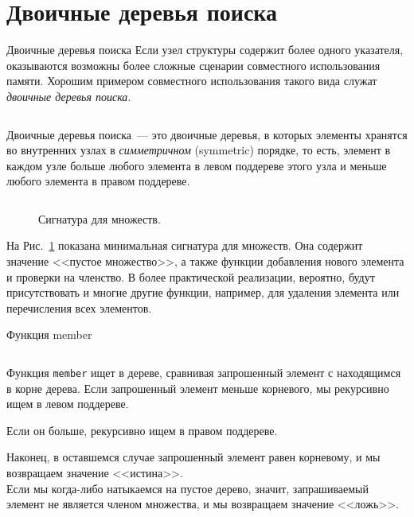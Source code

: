 \documentclass[aspectratio=169
  , xcolor={svgnames}
  , hyperref={ colorlinks,citecolor=DeepPink4
             , linkcolor=DarkRed,urlcolor=DarkBlue}
  , russian
  ]{beamer}
\newcommand{\term}[2]{\textit{#1} (#2)}
\theoremstyle{exerciseStyle1}
\begin{document}
\section{Двоичные деревья поиска}
\label{sc:2.2}

\begin{frame}{Двоичные деревья поиска}
Если узел структуры содержит более одного указателя, оказываются
возможны более сложные сценарии совместного использования памяти. Хорошим примером
совместного использования такого вида служат \emph{двоичные деревья поиска}.

\inputminted[firstline=10, lastline=10] {haskell}{code/SearchTree.hs}

Двоичные деревья поиска~--- это двоичные деревья, в которых элементы
хранятся во внутренних узлах в \term{симметричном}{symmetric}
порядке, то есть, элемент в каждом узле больше любого элемента в
левом поддереве этого узла и меньше любого элемента в правом
поддереве.
\end{frame}

\begin{frame}[fragile]{}
\begin{figure}[h]
  \centering
  \inputminted[firstline=12, lastline=16] {haskell}{code/SearchTree.hs}
  \caption{Сигнатура для множеств.}
\label{fig:2.7}
\end{figure}

На Рис.~\ref{fig:2.7} показана минимальная сигнатура для множеств. Она
содержит значение <<пустое множество>>, а также функции добавления
нового элемента и проверки на членство.  В более практической
реализации, вероятно, будут присутствовать и многие другие функции,
например, для удаления элемента или перечисления всех элементов.
\end{frame}

\begin{frame}[fragile]{Функция member}
  \inputminted[firstline=22, lastline=25] {haskell}{code/SearchTree.hs}

Функция \texttt{member} ищет в дереве, сравнивая запрошенный
элемент с находящимся в корне дерева. Если запрошенный элемент меньше
корневого, мы рекурсивно ищем в левом поддереве.

 Если он больше,
рекурсивно ищем в правом поддереве. 

Наконец, в оставшемся случае
запрошенный элемент равен корневому, и мы возвращаем значение
<<истина>>. \\

Если мы когда-либо натыкаемся на пустое дерево, значит,
запрашиваемый элемент не является членом множества, и мы возвращаем
значение <<ложь>>. 
\end{frame}
\end{document}
